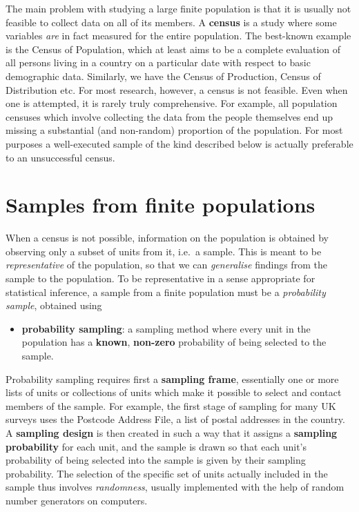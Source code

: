 The main problem with studying a large finite population is that it
is usually not feasible to collect data on all of its members.
A \textbf{census} is a study where some variables \emph{are}
in fact measured for the entire population. The best-known example is
the Census of Population, which at least aims to be a complete
evaluation of all persons living in a country on a particular date with
respect to basic demographic data. Similarly, we have the Census of
Production, Census of Distribution etc. For most research, however, a
census is not feasible. Even when one is attempted, it is rarely truly
comprehensive. For example, all population censuses which involve
collecting the data from the people themselves end up missing a
substantial (and non-random) proportion of the population. For most purposes
a well-executed sample of the kind described below is actually
preferable to an unsuccessful census.

\section{Samples from finite populations}
\label{s_samples_samples}

When a census is not possible, information on the population is obtained
by observing only a subset of units from it, i.e.\ a
sample. This is meant to be \emph{representative} of the
population, so that we can \emph{generalise} findings from the sample to
the population. To be representative in a sense appropriate for
statistical inference, a sample from a finite population must be a \emph{probability sample},
obtained using
\begin{itemize}
\item
\textbf{probability sampling}: a sampling method where every unit in the
population has a \textbf{known}, \textbf{non-zero} probability of being
selected to the sample.
\end{itemize}
Probability sampling requires first a \textbf{sampling frame},
essentially one or more lists of units or collections of units which
make it possible to select and contact members of the sample. For
example, the first stage of sampling for many UK surveys uses the
Postcode Address File, a list of postal addresses in the country. A
\textbf{sampling design} is then created in such a way that it assigns a
\textbf{sampling probability} for each unit, and the sample is drawn so
that each unit's probability of being selected into the sample is given
by their sampling probability. The selection of the specific set of
units actually included in the sample thus involves \emph{randomness},
usually implemented with the help of random number generators on
computers.

